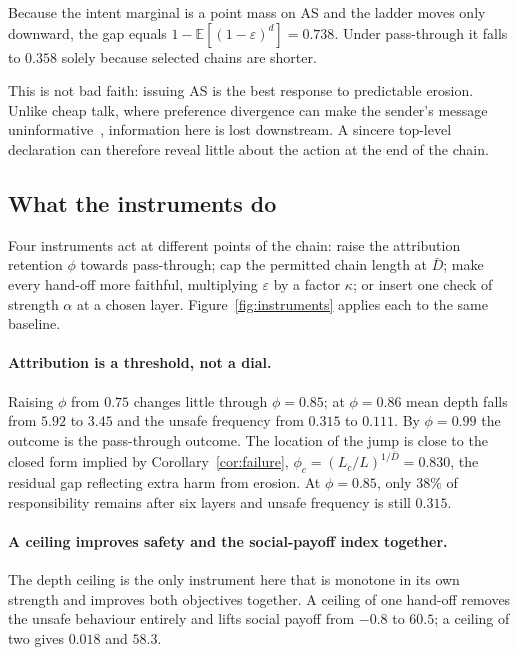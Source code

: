 \documentclass[a4paper,fleqn]{cas-sc}
\newcommand{\AS}{\textsf{AS}}
\begin{document}
Because the intent marginal is a point mass on \AS{} and the ladder moves only
downward, the gap equals $1-\mathbb{E}[(1-\varepsilon)^d]=0.738$. Under
pass-through it falls to $0.358$ solely because selected chains are shorter.

This is not bad faith: issuing \AS{} is the best response to predictable
erosion. Unlike cheap talk, where preference divergence can make the sender's
message uninformative~\citep{crawford1982strategic}, information here is lost
downstream. A sincere top-level declaration can therefore reveal little about
the action at the end of the chain.

\subsection{What the instruments do}
\label{sec:instruments}

Four instruments act at different points of the chain: raise the attribution
retention $\phi$ towards pass-through; cap the permitted chain length at
$\bar D$; make every hand-off more faithful, multiplying $\varepsilon$ by a
factor $\kappa$; or insert one check of strength $\alpha$ at a chosen layer.
Figure~\ref{fig:instruments} applies each to the same baseline.

\paragraph{Attribution is a threshold, not a dial.}
Raising $\phi$ from $0.75$ changes little through $\phi=0.85$; at $\phi=0.86$
mean depth falls from $5.92$ to $3.45$ and the unsafe frequency from $0.315$ to
$0.111$. By $\phi=0.99$ the outcome is the pass-through outcome. The location
of the jump is close to the closed form implied by
Corollary~\ref{cor:failure}, $\phi_{c}=(L_{c}/L)^{1/\bar D}=0.830$, the
residual gap reflecting extra harm from erosion. At $\phi=0.85$, only $38\%$ of
responsibility remains after six layers and unsafe frequency is still $0.315$.

\paragraph{A ceiling improves safety and the social-payoff index together.}
The depth ceiling is the only instrument here that is monotone in its own
strength and improves both objectives together. A ceiling of one hand-off
removes the unsafe behaviour entirely and lifts social payoff from $-0.8$ to
$60.5$; a ceiling of two gives $0.018$ and $58.3$.
\end{document}

